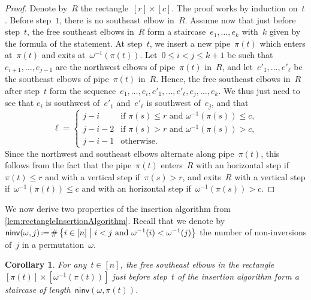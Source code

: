 \documentclass{amsart}
\newtheorem{corollary}[theorem]{Corollary}
\theoremstyle{definition}
\newcommand{\set}[2]{\left\{ #1 \;\middle|\; #2 \right\}} %
\newcommand{\eqdef}{\mbox{\,\raisebox{0.2ex}{\scriptsize\ensuremath{\mathrm:}}\ensuremath{=}\,}} %
\newcommand{\noninversions}[2]{\mathsf{ninv}(#1,#2)} %
\begin{document}
\begin{proof}
Denote by~$R$ the rectangle~$[r] \times [c]$.
The proof works by induction on~$t$.
Before step~$1$, there is no southeast elbow in~$R$.
Assume now that just before step~$t$, the free southeast elbows in~$R$ form a staircase~$e_1, \dots, e_k$ with~$k$ given by the formula of the statement.
At step~$t$, we insert a new pipe~$\pi(t)$ which enters at~$\pi(t)$ and exits at~$\omega^{-1}(\pi(t))$.
Let~${0 \le i < j \le k+1}$ be such that~$e_{i+1}, \dots, e_{j-1}$ are the northwest elbows of pipe~$\pi(t)$ in~$R$, and let~$e'_1, \dots, e'_\ell$ be the southeast elbows of pipe~$\pi(t)$ in~$R$.
Hence, the free southeast elbows in~$R$ after step~$t$ form the sequence~$e_1, \dots, e_i, e'_1, \dots, e'_\ell, e_j, \dots, e_k$.
We thus just need to see that $e_i$ is southwest of~$e'_1$ and~$e'_\ell$ is southwest of~$e_j$, and that
\[
\ell = \begin{cases} j-i  & \text{if } \pi(s) \le r \text{ and } \omega^{-1}(\pi(s)) \le c, \\  j-i-2  & \text{if } \pi(s) > r \text{ and } \omega^{-1}(\pi(s)) > c, \\  j-i-1 & \text{otherwise.} \end{cases}
\]
Since the northwest and southeast elbows alternate along pipe~$\pi(t)$, this follows from the fact that the pipe~$\pi(t)$ enters~$R$ with an horizontal step if~$\pi(t) \le r$ and with a vertical step if~$\pi(s) > r$, and exits~$R$ with a vertical step if~$\omega^{-1}(\pi(t)) \le c$ and with an horizontal step if~$\omega^{-1}(\pi(s)) > c$.
\end{proof}

We now derive two properties of the insertion algorithm from \cref{lem:rectangleInsertionAlgorithm}.
Recall that we denote by~$\noninversions{\omega}{j} \eqdef \#\set{i \in [n]}{i < j \text{ and } \omega^{-1}(i) < \omega^{-1}(j)}$ the number of non-inversions of~$j$ in a permutation~$\omega$.

\begin{corollary}
\label{coro:rectangleInsertionAlgorithm1}
For any~$t \in [n]$, the free southeast elbows in the rectangle~$[\pi(t)] \times [\omega^{-1}(\pi(t))]$ just before step~$t$ of the insertion algorithm form a staircase of length~$\noninversions{\omega}{\pi(t)}$.
\end{corollary}
\end{document}
